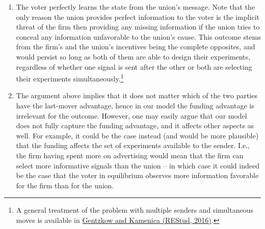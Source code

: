 \documentclass[a4paper]{article}
\begin{document}
\begin{enumerate}
		\item The voter perfectly learns the state from the union's message. Note that the only reason the union provides perfect information to the voter is the implicit threat of the firm then providing any missing information if the union tries to conceal any information unfavorable to the union's cause. This outcome stems from the firm's and the union's incentives being the complete opposites, and would persist so long as both of them are able to design their experiments, regardless of whether one signal is sent after the other or both are selecting their experiments simultaneously.\footnote{A general treatment of the problem with multiple senders and simultaneous moves is available in \href{https://doi.org/10.1093/restud/rdw052}{Gentzkow and Kamenica (REStud, 2016)}.}
		
		\item The argument above implies that it does not matter which of the two parties have the last-mover advantage, hence in our model the funding advantage is irrelevant for the outcome. However, one may easily argue that our model does not fully capture the funding advantage, and it affects other aspects as well. For example, it could be the case instead (and would be more plausible) that the funding affects the set of experiments available to the sender. I.e., the firm having spent more on advertising would mean that the firm can select more informative signals than the union -- in which case it could indeed be the case that the voter in equilibrium observes more information favorable for the firm than for the union.
	\end{enumerate}
\fi





\end{document}
